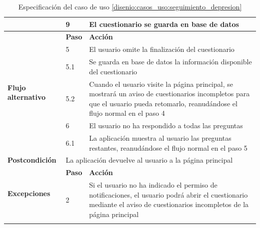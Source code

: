 \begin{table}[h]
\begin{tabularx}{\textwidth}{|l|l|X|}
                    \cline{2-3} & 9 & El cuestionario se guarda en base de datos \\
                    \hline
                    \multirow{6}{*}{\textbf{Flujo alternativo}} & \textbf{Paso} & \textbf{Acción} \\
                    \cline{2-3} & 5 & El usuario omite la finalización del cuestionario \\
                    \cline{2-3} & 5.1 & Se guarda en base de datos la información disponible del cuestionario \\
                    \cline{2-3} & 5.2 & Cuando el usuario visite la página principal, se mostrará un aviso de cuestionarios incompletos para que el usuario pueda retomarlo, reanudándose el flujo normal en el paso 4 \\
                    \cline{2-3} & 6 & El usuario no ha respondido a todas las preguntas \\
                    \cline{2-3} & 6.1 & La aplicación muestra al usuario las preguntas restantes, reanudándose el flujo normal en el paso 5 \\
                    \hline
                    \textbf{Postcondición} & \multicolumn{2}{|X|}{La aplicación devuelve al usuario a la página principal} \\
                    \hline
                    \multirow{2}{*}{\textbf{Excepciones}}  & \textbf{Paso} & \textbf{Acción} \\
                    \cline{2-3} & 2 & Si el usuario no ha indicado el permiso de notificaciones, el usuario podrá abrir el cuestionario mediante el aviso de cuestionarios incompletos de la página principal \\
                    \hline
                    \caption{Especificación del caso de uso \ref{disenio:casos_uso:seguimiento_depresion}}
                    \label{tabla:casos_uso:seguimiento_depresion}
                \end{tabularx}
            \end{table}

